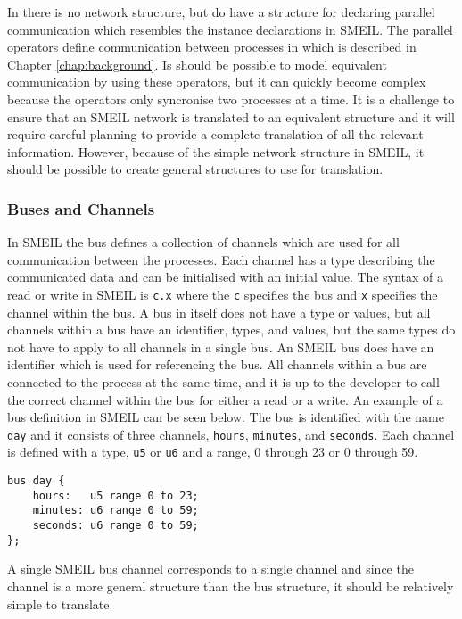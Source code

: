 In \cspm{} there is no network structure, but \cspm{} do have a structure for declaring parallel communication which resembles the instance declarations in SMEIL. The parallel operators define communication between processes in \cspm{} which is described in Chapter \ref{chap:background}. Is should be possible to model equivalent communication by using these operators, but it can quickly become complex because the operators only syncronise two processes at a time. It is a challenge to ensure that an SMEIL network is translated to an equivalent \cspm{} structure and it will require careful planning to provide a complete translation of all the relevant information. However, because of the simple network structure in SMEIL, it should be possible to create general \cspm{} structures to use for translation.
\subsubsection{Buses and Channels}
\label{bus_and_channels}
In SMEIL the bus defines a collection of channels which are used for all communication between the processes. Each channel has a type describing the communicated data and can be initialised with an initial value. The syntax of a read or write in SMEIL is \texttt{c.x} where the \texttt{c} specifies the bus and \texttt{x} specifies the channel within the bus. A bus in itself does not have a type or values, but all channels within a bus have an identifier, types, and values, but the same types do not have to apply to all channels in a single bus. An SMEIL bus does have an identifier which is used for referencing the bus. All channels within a bus are connected to the process at the same time, and it is up to the developer to call the correct channel within the bus for either a read or a write.
An example of a bus definition in SMEIL can be seen below. The bus is identified with the name \texttt{day} and it consists of three channels, \texttt{hours}, \texttt{minutes}, and \texttt{seconds}. Each channel is defined with a type, \texttt{u5} or \texttt{u6} and a range, 0 through 23 or 0 through 59.
\begin{verbatim}
bus day {
    hours:   u5 range 0 to 23;
    minutes: u6 range 0 to 59;
    seconds: u6 range 0 to 59;
};
\end{verbatim}
A single SMEIL bus channel corresponds to a single \cspm{} channel and since the channel is a more general structure than the bus structure, it should be relatively simple to translate.
